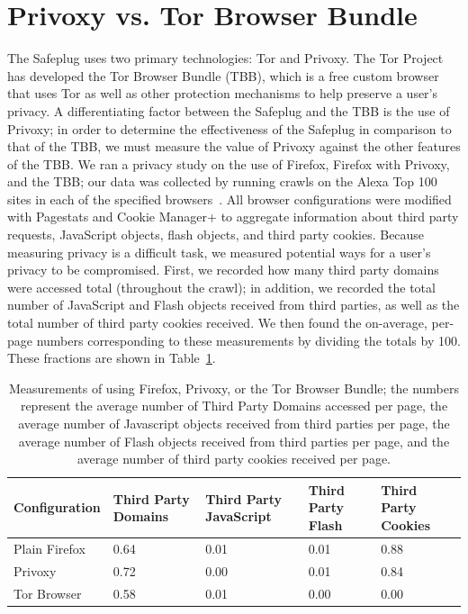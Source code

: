 \documentclass[letterpaper,twocolumn,10pt]{article}
\begin{document}
\section{Privoxy vs. Tor Browser Bundle}
The Safeplug uses two primary technologies: Tor and Privoxy.  The Tor Project has developed the Tor Browser Bundle (TBB), which is a free custom browser that uses Tor as well as other protection mechanisms to help preserve a user's privacy.  A differentiating factor between the Safeplug and the TBB is the use of Privoxy; in order to determine the effectiveness of the Safeplug in comparison to that of the TBB, we must measure the value of Privoxy against the other features of the TBB.  We ran a privacy study on the use of Firefox, Firefox with Privoxy, and the TBB; our data was collected by running crawls on the Alexa Top 100 sites in each of the specified browsers~\cite{alexa}.  All browser configurations were modified with Pagestats \cite{pagestats} and Cookie Manager+ \cite{cookiemonster} to aggregate information about third party requests, JavaScript objects, flash objects, and third party cookies.  Because measuring privacy is a difficult task, we measured potential ways for a user's privacy to be compromised.  First, we recorded how many third party domains were accessed total (throughout the crawl); in addition, we recorded the total number of JavaScript and Flash objects received from third parties, as well as the total number of third party cookies received.  We then found the on-average, per-page numbers corresponding to these measurements by dividing the totals by 100.  These fractions are shown in Table~\ref{tbb}.

\begin{table}[!t]
\renewcommand{\arraystretch}{1.3}
\centering
\small
	\begin{tabular}{| p{1.85cm} | p{1.3cm} | p{1.25cm} | p{.7cm} | p{1cm} |}
	\hline
		Configuration & Third Party Domains & Third Party JavaScript & Third Party Flash & Third Party Cookies \\ \hline
		Plain Firefox	& 0.64 & 0.01 & 0.01 & 0.88 \\ \hline
		Privoxy & 0.72 & 0.00 & 0.01 & 0.84 \\ \hline
		Tor Browser	& 0.58 & 0.01 & 0.00 & 0.00 \\ \hline
	\end{tabular}
\caption{Measurements of using Firefox, Privoxy, or the Tor Browser Bundle; the numbers represent the average number of Third Party Domains accessed per page, the average number of Javascript objects received from third parties per page, the average number of Flash objects received from third parties per page, and the average number of third party cookies received per page.}
\label{tbb}
\end{table}
\end{document}

